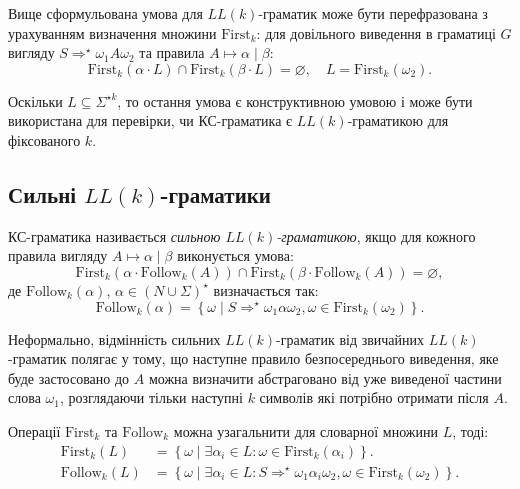 Вище сформульована умова для $LL(k)$-граматик може бути перефразована з урахуванням визначення множини $\text{First}_k$: для довільного виведення в граматиці $G$ вигляду $S \Rightarrow^\star \omega_1 A \omega_2$ та правила $A \mapsto \alpha \mid \beta$:
\begin{equation}
	\text{First}_k(\alpha \cdot L) \cap \text{First}_k (\beta \cdot L) = \varnothing, \quad L = \text{First}_k(\omega_2).
\end{equation}

Оскільки $L \subseteq \Sigma^{\star k}$, то остання умова є конструктивною умовою і може бути використана для перевірки, чи КС-граматика є $LL(k)$-граматикою для фіксованого $k$.

\subsection{Сильні $LL(k)$-граматики}

КС-граматика називається \textit{сильною $LL(k)$-граматикою}, якщо для кожного правила вигляду $A \mapsto \alpha \mid \beta$ виконується умова:
\begin{equation}
	\text{First}_k (\alpha \cdot \text{Follow}_k (A)) \cap \text{First}_k (\beta \cdot \text{Follow}_k (A)) = \varnothing,
\end{equation}
де $\text{Follow}_k(\alpha)$, $\alpha \in (N \cup \Sigma)^\star$ визначається так:
\begin{equation}
	\text{Follow}_k (\alpha) = \left\{ \omega \mid S \Rightarrow^\star \omega_1 \alpha \omega_2, \omega \in \text{First}_k(\omega_2) \right\}.
\end{equation}

Неформально, відмінність сильних $LL(k)$-граматик від звичайних $LL(k)$-граматик полягає у тому, що наступне правило безпосереднього виведення, яке буде застосовано до $A$ можна визначити абстраговано від уже виведеної частини слова $\omega_1$, розглядаючи тільки наступні $k$ символів які потрібно отримати після $A$. \medskip

Операції $\text{First}_k$ та $\text{Follow}_k$ можна узагальнити для словарної множини $L$, тоді:
\begin{align*}
	\text{First}_k (L) &= \left\{ \omega \mid \exists \alpha_i \in L: \omega \in \text{First}_k (\alpha_i) \right\}. \\
	\text{Follow}_k (L) &= \left\{ \omega \mid \exists \alpha_i \in L: S \Rightarrow^\star \omega_1 \alpha_i \omega_2, \omega \in \text{First}_k (\omega_2) \right\}.
\end{align*}

